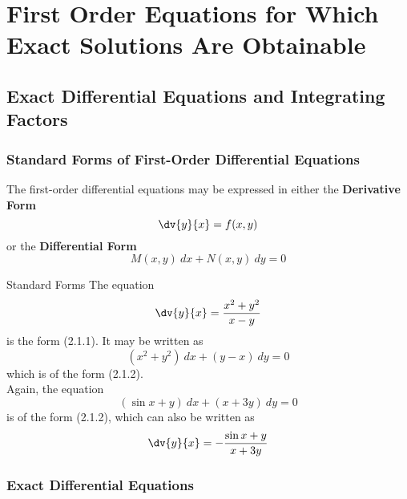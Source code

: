 
\section{First Order Equations for Which Exact Solutions Are Obtainable}


\subsection{Exact Differential Equations and Integrating Factors}


\subsubsection{Standard Forms of First-Order Differential Equations}
The first-order differential equations may be expressed in either the \textbf{Derivative Form}
\begin{equation}
    \dv{y}{x} = f(x,y)
\end{equation}
or the \textbf{Differential Form}
\begin{equation}
    M(x,y) \: d{x} + N(x,y) \: d{y} = 0
\end{equation}

\begin{example}{Standard Forms}{}
    The equation \[
        \dv{y}{x} = \frac{x^2 + y^2}{x-y}
    \]
    is the form (2.1.1). It may be written as \[
        (x^2 + y^2) \: dx + (y-x) \: dy = 0
    \] which is of the form (2.1.2). \\
    Again, the equation \[
        (\sin x + y) \: dx + (x + 3y) \: dy = 0
    \] is of the form (2.1.2), which can also be written as \[
    \dv{y}{x} = - \frac{\sin x + y}{x + 3y}
    \]
\end{example}


\subsubsection{Exact Differential Equations}

